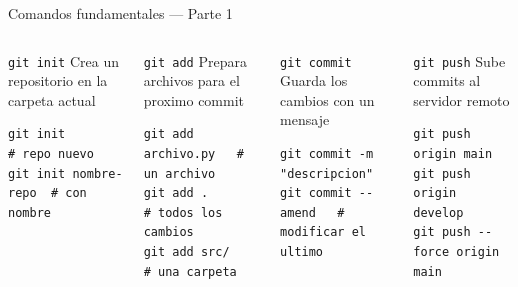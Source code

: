 \documentclass[aspectratio=169]{beamer}
\begin{document}
\begin{frame}[fragile]{Comandos fundamentales --- Parte 1}
  \begin{columns}
      \begin{exampleblock}{\texttt{git init}}
        Crea un repositorio en la carpeta actual
        \begin{lstlisting}[style=bash]
git init              # repo nuevo
git init nombre-repo  # con nombre
        \end{lstlisting}
      \end{exampleblock}

      \vspace{0.3cm}

      \begin{exampleblock}{\texttt{git add}}
        Prepara archivos para el proximo commit
        \begin{lstlisting}[style=bash]
git add archivo.py   # un archivo
git add .            # todos los cambios
git add src/         # una carpeta
        \end{lstlisting}
      \end{exampleblock}

      \begin{exampleblock}{\texttt{git commit}}
        Guarda los cambios con un mensaje
        \begin{lstlisting}[style=bash]
git commit -m "descripcion"
git commit --amend   # modificar el ultimo
        \end{lstlisting}
      \end{exampleblock}

      \vspace{0.3cm}

      \begin{exampleblock}{\texttt{git push}}
        Sube commits al servidor remoto
        \begin{lstlisting}[style=bash]
git push origin main
git push origin develop
git push --force origin main
        \end{lstlisting}
      \end{exampleblock}
  \end{columns}
\end{frame}
\end{document}
